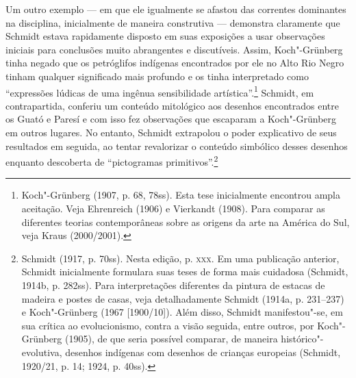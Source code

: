 Um outro exemplo --- em que ele igualmente se afastou das correntes
dominantes na disciplina, inicialmente de maneira construtiva ---
demonstra claramente que Schmidt estava rapidamente disposto em suas
exposições a usar observações iniciais para conclusões muito abrangentes
e discutíveis. Assim, Koch"-Grünberg tinha negado que os petróglifos
indígenas encontrados por ele no Alto Rio Negro tinham qualquer
significado mais profundo e os tinha interpretado como ``expressões
lúdicas de uma ingênua sensibilidade artística''.\footnote{Koch"-Grünberg
  (1907, p. 68, 78ss). Esta tese inicialmente encontrou ampla aceitação.
  Veja Ehrenreich (1906) e Vierkandt (1908). Para comparar as
  diferentes teorias contemporâneas sobre as origens da arte na América
  do Sul, veja Kraus (2000/2001).} Schmidt, em contrapartida, conferiu
um conteúdo mitológico aos desenhos encontrados entre os Guató e Paresí
e com isso fez observações que escaparam a Koch"-Grünberg em outros
lugares. No entanto, Schmidt extrapolou o poder explicativo de seus
resultados em seguida, ao tentar revalorizar o conteúdo simbólico
desses desenhos enquanto descoberta de ``pictogramas
primitivos''.\footnote{Schmidt (1917, p. 70ss). Nesta edição, p. \textsc{xxx}.
  Em uma publicação anterior, Schmidt inicialmente formulara suas teses
  de forma mais cuidadosa (Schmidt, 1914b, p. 282ss). Para
  interpretações diferentes da pintura de estacas de madeira e postes de
  casas, veja detalhadamente Schmidt (1914a, p. 231--237) e Koch"-Grünberg
  (1967 {[}1900/10{]}). Além disso, Schmidt manifestou"-se, em sua
  crítica ao evolucionismo, contra a visão seguida, entre outros, por
  Koch"-Grünberg (1905), de que seria possível comparar, de maneira
  histórico"-evolutiva, desenhos indígenas com desenhos de crianças
  europeias (Schmidt, 1920/21, p. 14; 1924, p. 40ss).}


